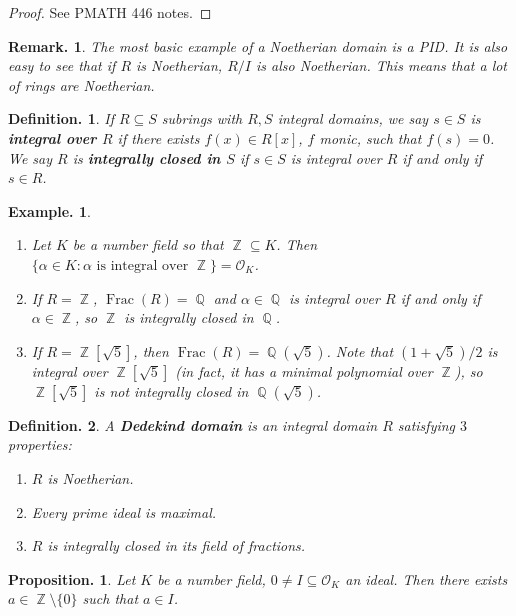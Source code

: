 \documentclass[11pt, a4paper]{memoir}
\DeclareMathOperator{\Q}{{\mathbb{Q}}}
\DeclareMathOperator{\Z}{{\mathbb{Z}}}
\theoremstyle{change}
\newtheorem{proposition}[theorem]{Proposition.}
\theoremstyle{plain}
\theoremstyle{nonumberplain}
\newtheorem{definition}{Definition.}
\newtheorem{example}{Example.}
\newtheorem{remark}{Remark.}
\newtheorem{proof}{Proof}
\DeclareMathOperator{\Frac}{Frac}
\newcommand{\mbf}[1]{{\boldmath\bfseries #1}}
\numberwithin{equation}{section}
\begin{document}
\begin{proof}
    See PMATH 446 notes.
\end{proof}
\begin{remark}
    The most basic example of a Noetherian domain is a PID.
    It is also easy to see that if $R$ is Noetherian, $R/I$ is also Noetherian.
    This means that a lot of rings are Noetherian.
\end{remark}
\begin{definition}
    If $R\subseteq S$ subrings with $R,S$ integral domains, we say $s\in S$ is \mbf{integral over $R$} if there exists $f(x)\in R[x]$, $f$ monic, such that $f(s)=0$.
    We say $R$ is \mbf{integrally closed in $S$} if $s\in S$ is integral over $R$ if and only if $s\in R$.
\end{definition}
\begin{example}
    \begin{enumerate}[nl]
        \item Let $K$ be a number field so that $\Z\subseteq K$.
            Then $\{\alpha\in K:\alpha\text{ is integral over }\Z\}=\mathcal{O}_K$.
        \item If $R=\Z$, $\Frac(R)=\Q$ and $\alpha\in\Q$ is integral over $R$ if and only if  $\alpha\in\Z$, so $\Z$ is integrally closed in $\Q$.

        \item If $R=\Z[\sqrt{5}]$, then $\Frac(R)=\Q(\sqrt{5})$.
            Note that $(1+\sqrt{5})/2$ is integral over $\Z[\sqrt{5}]$ (in fact, it has a minimal polynomial over $\Z$), so $\Z[\sqrt{5}]$ is not integrally closed in $\Q(\sqrt{5})$.
    \end{enumerate}
\end{example}
\begin{definition}
    A \mbf{Dedekind domain} is an integral domain $R$ satisfying $3$ properties:
    \begin{enumerate}[nolistsep]
        \item $R$ is Noetherian.
        \item Every prime ideal is maximal.
        \item $R$ is integrally closed in its field of fractions.
    \end{enumerate}
\end{definition}
\begin{proposition}\label{prop:id-scale}
    Let $K$ be a number field, $0\neq I\subseteq\mathcal{O}_K$ an ideal.
    Then there exists $a\in\Z\setminus\{0\}$ such that $a\in I$.
\end{proposition}
\end{document}
